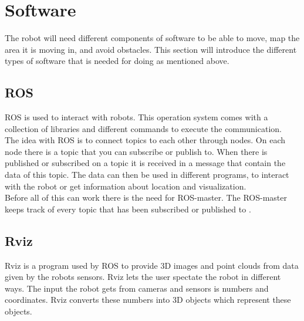 \section{Software}
The robot will need different components of software to be able to move, map the area it is moving in, and avoid obstacles. This section will introduce the different types of software that is needed for doing as mentioned above.

\subsection{ROS}
ROS is used to interact with robots. This operation system comes with a collection of libraries and different commands to execute the communication.\\
The idea with ROS is to connect topics to each other through nodes. On each node there is a topic that you can subscribe or publish to. When there is published or subscribed on a topic it is received in a message that contain the data of this topic. The data can then be used in different programs, to interact with the robot or get information about location and visualization. \\
Before all of this can work there is the need for ROS-master. The ROS-master keeps track of every topic that has been subscribed or published to \cite{ROSwiki}.

\subsection{Rviz}
Rviz is a program used by ROS to provide 3D images and point clouds from data given by the robots sensors. Rviz lets the user spectate the robot in different ways. The input the robot gets from cameras and sensors is numbers and coordinates. Rviz converts these numbers into 3D objects which represent these objects\cite{interactiveMarkers}.




